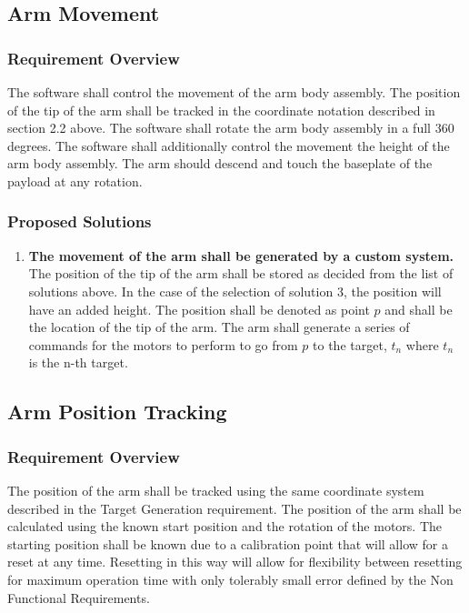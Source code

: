 \documentclass[letterpaper,10pt]{article}
\begin{document}
\subsection{Arm Movement}
\subsubsection{Requirement Overview}
The software shall control the movement of the arm body assembly. 
The position of the tip of the arm shall be tracked in the coordinate notation described in section 2.2 above.
The software shall rotate the arm body assembly in a full 360 degrees.
The software shall additionally control the movement the height of the arm body assembly.
The arm should descend and touch the baseplate of the payload at any rotation.
\subsubsection{Proposed Solutions}
\begin{enumerate}
\item{
\textbf{The movement of the arm shall be generated by a custom system.} 
The position of the tip of the arm shall be stored as decided from the list of solutions above. 
In the case of the selection of solution 3, the position will have an added height. 
The position shall be denoted as point \(p\) and shall be the location of the tip of the arm.
The arm shall generate a series of commands for the motors to perform to go from \(p\) to the target, 
\(t_{n}\) where \(t_{n}\) is the n-th target.
}
\end{enumerate}

\subsection{Arm Position Tracking}
\subsubsection{Requirement Overview}
The position of the arm shall be tracked using the same coordinate system described in the Target Generation requirement.
The position of the arm shall be calculated using the known start position and the rotation of the motors.
The starting position shall be known due to a calibration point that will allow for a reset at any time.
Resetting in this way will allow for flexibility between resetting for maximum operation time with only tolerably small error defined by the Non Functional Requirements.
\end{document}
